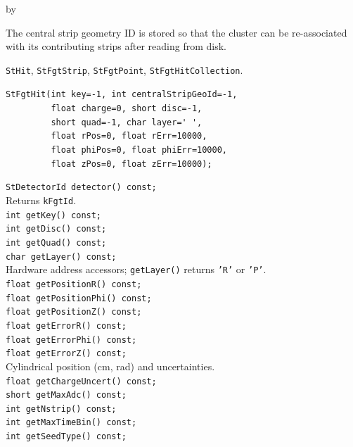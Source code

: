 \documentclass[twoside]{article}
\newcommand{\entrylabel}[1]{\mbox{\textbf{{#1}}}\hfil}%
\newenvironment{entry}
{\begin{list}{}%
    {\renewcommand{\makelabel}{\entrylabel}%
     \setlength{\labelwidth}{90pt}%
     \setlength{\leftmargin}{\labelwidth}
     \advance\leftmargin by \labelsep%
      }%
    }%
  {\end{list}}
\newcommand{\Entrylabel}[1]%
{\raisebox{0pt}[1ex][0pt]{\makebox[\labelwidth][l]%
    {\parbox[t]{\labelwidth}{\hspace{0pt}\textbf{{#1}}}}}}
\newenvironment{Entry}%
{\renewcommand{\entrylabel}{\Entrylabel}\begin{entry}}%
  {\end{entry}}
\begin{document}
\begin{Entry}
  The central strip geometry ID is stored so that the cluster can be re-associated with
  its contributing strips after reading from disk.
\item[Related Classes]
  \texttt{StHit}, \texttt{StFgtStrip}, \texttt{StFgtPoint}, \texttt{StFgtHitCollection}.
\item[Public\\ Constructors]
    \verb+StFgtHit(int key=-1, int centralStripGeoId=-1,+\\
    \verb+         float charge=0, short disc=-1,+\\
    \verb+         short quad=-1, char layer=' ',+\\
    \verb+         float rPos=0, float rErr=10000,+\\
    \verb+         float phiPos=0, float phiErr=10000,+\\
    \verb+         float zPos=0, float zErr=10000);+\\
\item[Public Member\\ Functions]
    \verb+StDetectorId detector() const;+\\
    Returns \texttt{kFgtId}.\\[2pt]
    \verb+int getKey() const;+\\
    \verb+int getDisc() const;+\\
    \verb+int getQuad() const;+\\
    \verb+char getLayer() const;+\\
    Hardware address accessors; \texttt{getLayer()} returns \texttt{'R'} or \texttt{'P'}.\\[2pt]
    \verb+float getPositionR() const;+\\
    \verb+float getPositionPhi() const;+\\
    \verb+float getPositionZ() const;+\\
    \verb+float getErrorR() const;+\\
    \verb+float getErrorPhi() const;+\\
    \verb+float getErrorZ() const;+\\
    Cylindrical position (cm, rad) and uncertainties.\\[2pt]
    \verb+float getChargeUncert() const;+\\
    \verb+short getMaxAdc() const;+\\
    \verb+int getNstrip() const;+\\
    \verb+int getMaxTimeBin() const;+\\
    \verb+int getSeedType() const;+\\

\end{Entry}
\end{document}
